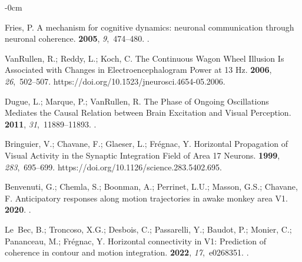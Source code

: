 \documentclass[brainsci, %
               review,accept,pdftex,moreauthors
               ]{Definitions/mdpi}
\begin{document}
\begin{adjustwidth}{-\extralength}{0cm}
\begin{thebibliography}{999}
Fries, P.
\newblock A mechanism for cognitive dynamics: neuronal communication through
  neuronal coherence.
 {\bf 2005}, {\em 9},~474--480.
.

VanRullen, R.; Reddy, L.; Koch, C.
\newblock The {Continuous} {Wagon} {Wheel} {Illusion} {Is} {Associated} with
  {Changes} in {Electroencephalogram} {Power} at 13 {Hz}.
 {\bf 2006}, {\em 26},~502--507.
 {{https://doi.org/10.1523/jneurosci.4654-05.2006}}.

Dugue, L.; Marque, P.; VanRullen, R.
\newblock The {Phase} of {Ongoing} {Oscillations} {Mediates} the {Causal}
  {Relation} between {Brain} {Excitation} and {Visual} {Perception}.
 {\bf 2011}, {\em 31},~11889--11893.
.

Bringuier, V.; Chavane, F.; Glaeser, L.; Frégnac, Y.
\newblock Horizontal {Propagation} of {Visual} {Activity} in the {Synaptic}
  {Integration} {Field} of {Area} 17 {Neurons}.
 {\bf 1999}, {\em 283},~695--699.
  {{https://doi.org/10.1126/science.283.5402.695}}.

Benvenuti, G.; Chemla, S.; Boonman, A.; Perrinet, L.U.; Masson, G.S.; Chavane,
  F.
\newblock Anticipatory responses along motion trajectories in awake monkey area
  {V1}.
 {\bf 2020}.
.

Le~Bec, B.; Troncoso, X.G.; Desbois, C.; Passarelli, Y.; Baudot, P.; Monier,
  C.; Pananceau, M.; Frégnac, Y.
\newblock Horizontal connectivity in {V1}: {Prediction} of coherence in contour
  and motion integration.
 {\bf 2022}, {\em 17},~e0268351.
.


\end{thebibliography}
\end{adjustwidth}
\end{document}
